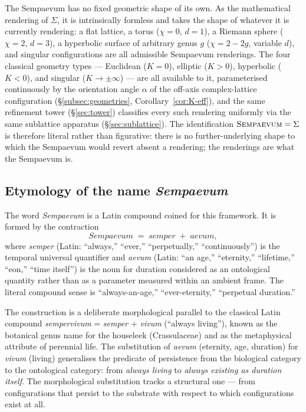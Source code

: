 \documentclass[11pt,a4paper]{article}
\theoremstyle{definition}
\theoremstyle{remark}
\newcommand{\Sempaevum}{\textsc{Sempaevum}}
\begin{document}
The Sempaevum has no fixed geometric shape of its own. As the mathematical rendering of $\Sigma$, it is intrinsically formless and takes the shape of whatever it is currently rendering: a flat lattice, a torus ($\chi=0$, $d=1$), a Riemann sphere ($\chi=2$, $d=3$), a hyperbolic surface of arbitrary genus $g$ ($\chi=2-2g$, variable $d$), and singular configurations are all admissible Sempaevum renderings. The four classical geometry types --- Euclidean ($K=0$), elliptic ($K>0$), hyperbolic ($K<0$), and singular ($K\to\pm\infty$) --- are all available to it, parameterised continuously by the orientation angle $\alpha$ of the off-axis complex-lattice configuration (\S\ref{subsec:geometries}, Corollary~\ref{cor:K-eff}), and the same refinement tower (\S\ref{sec:tower}) classifies every such rendering uniformly via the same sublattice apparatus (\S\ref{sec:sublattice}). The identification $\Sempaevum = \Sigma$ is therefore literal rather than figurative: there is no further-underlying shape to which the Sempaevum would revert absent a rendering; the renderings are what the Sempaevum is.

\subsection{Etymology of the name \emph{Sempaevum}}\label{subsec:etymology}

The word \emph{Sempaevum} is a Latin compound coined for this framework. It is formed by the contraction
\[
\textit{Sempaevum} \;=\; \textit{semper} \;+\; \textit{aevum},
\]
where \emph{semper} (Latin: ``always,'' ``ever,'' ``perpetually,'' ``continuously'') is the temporal universal quantifier and \emph{aevum} (Latin: ``an age,'' ``eternity,'' ``lifetime,'' ``eon,'' ``time itself'') is the noun for duration considered as an ontological quantity rather than as a parameter measured within an ambient frame. The literal compound sense is ``always-an-age,'' ``ever-eternity,'' ``perpetual duration.''

The construction is a deliberate morphological parallel to the classical Latin compound \emph{sempervivum} = \emph{semper} + \emph{vivum} (``always living''), known as the botanical genus name for the houseleek (Crassulaceae) and as the metaphysical attribute of perennial life. The substitution of \emph{aevum} (eternity, age, duration) for \emph{vivum} (living) generalises the predicate of persistence from the biological category to the ontological category: from \emph{always living} to \emph{always existing as duration itself}. The morphological substitution tracks a structural one --- from configurations that persist to the substrate with respect to which configurations exist at all.
\end{document}
